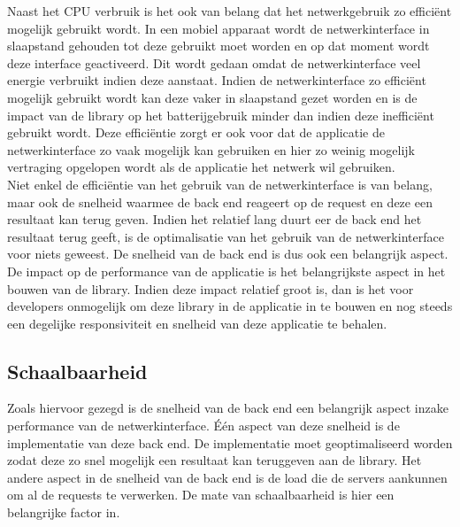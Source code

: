 \noindent Naast het CPU verbruik is het ook van belang dat het netwerkgebruik zo effici\"ent mogelijk gebruikt wordt. In een mobiel apparaat wordt de netwerkinterface in slaapstand gehouden tot deze gebruikt moet worden en op dat moment wordt deze interface geactiveerd. Dit wordt gedaan omdat de netwerkinterface veel energie verbruikt indien deze aanstaat. Indien de netwerkinterface zo effici\"ent mogelijk gebruikt wordt kan deze vaker in slaapstand gezet worden en is de impact van de library op het batterijgebruik minder dan indien deze ineffici\"ent gebruikt wordt. Deze effici\"entie zorgt er ook voor dat de applicatie de netwerkinterface zo vaak mogelijk kan gebruiken en hier zo weinig mogelijk vertraging opgelopen wordt als de applicatie het netwerk wil gebruiken. \\

\noindent Niet enkel de effici\"entie van het gebruik van de netwerkinterface is van belang, maar ook de snelheid waarmee de back end reageert op de request en deze een resultaat kan terug geven. Indien het relatief lang duurt eer de back end het resultaat terug geeft, is de optimalisatie van het gebruik van de netwerkinterface voor niets geweest. De snelheid van de back end is dus ook een belangrijk aspect. \\

\noindent De impact op de performance van de applicatie is het belangrijkste aspect in het bouwen van de library. Indien deze impact relatief groot is, dan is het voor developers onmogelijk om deze library in de applicatie in te bouwen en nog steeds een degelijke responsiviteit en snelheid van deze applicatie te behalen. 

\subsection{Schaalbaarheid}
Zoals hiervoor gezegd is de snelheid van de back end een belangrijk aspect inzake performance van de netwerkinterface. \'E\'en aspect van deze snelheid is de implementatie van deze back end. De implementatie moet geoptimaliseerd worden zodat deze zo snel mogelijk een resultaat kan teruggeven aan de library. Het andere aspect in de snelheid van de back end is de load die de servers aankunnen om al de requests te verwerken. De mate van schaalbaarheid is hier een belangrijke factor in. \\

